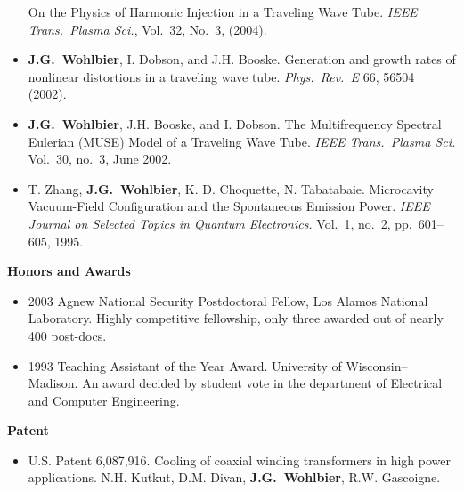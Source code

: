 \documentclass[12pt]{article}
\begin{document}
\begin{itemize}
  On the Physics of Harmonic Injection in a Traveling Wave Tube.
  {\it IEEE Trans.~Plasma Sci.}, Vol.~32, No.~3, (2004).
\item \textbf{J.G.~Wohlbier}, I. Dobson, and J.H. Booske.
  Generation and growth rates of nonlinear distortions in a traveling
  wave tube. {\it Phys.~Rev.~E} 66, 56504 (2002).
\item \textbf{J.G.~Wohlbier}, J.H. Booske, and I. Dobson.
  The Multifrequency Spectral Eulerian (MUSE) Model of a Traveling Wave
  Tube. {\it IEEE Trans.~Plasma Sci.} Vol.~30, no.~3, June 2002.
\item T. Zhang, \textbf{J.G.~Wohlbier}, K. D. Choquette, N. Tabatabaie.
  Microcavity Vacuum-Field Configuration and the Spontaneous Emission
  Power. {\it IEEE Journal on Selected Topics in Quantum Electronics.}
  Vol.~1, no.~2, pp.~601--605, 1995.
\end{itemize}


\noindent\textbf{Honors and Awards}
\begin{itemize}
\item 2003 Agnew National Security Postdoctoral Fellow, Los Alamos
  National Laboratory. Highly competitive fellowship, only three
  awarded out of nearly 400 post-docs.
\item 1993 Teaching Assistant of the Year Award. University of
  Wisconsin--Madison.
  An award decided by student vote in the department of Electrical and
  Computer Engineering.
\end{itemize}

\noindent\textbf{Patent}
\begin{itemize}
\item U.S. Patent 6,087,916. Cooling of coaxial winding transformers in
  high power applications. N.H. Kutkut, D.M. Divan, \textbf{J.G.~Wohlbier},
  R.W. Gascoigne.
\end{itemize}
\end{document}
